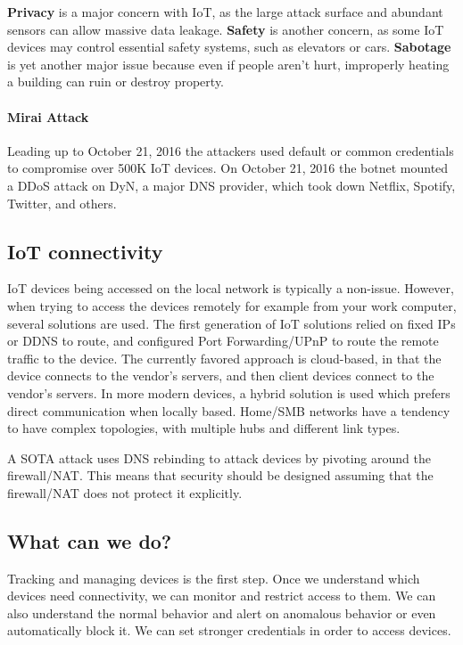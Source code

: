 \documentclass{idc_msc}
\begin{document}
\textbf{Privacy} is a major concern with IoT, as the large attack surface and abundant sensors can allow massive data leakage.
\textbf{Safety} is another concern, as some IoT devices may control essential safety systems, such as elevators or cars.
\textbf{Sabotage} is yet another major issue because even if people aren't hurt, improperly heating a building can ruin or destroy property.

\paragraph{Mirai Attack}

Leading up to October 21, 2016 the attackers used default or common credentials to compromise over 500K IoT devices.
On October 21, 2016 the botnet mounted a DDoS attack on DyN, a major DNS provider, which took down Netflix, Spotify, Twitter, and others.

\subsection{IoT connectivity}

IoT devices being accessed on the local network is typically a non-issue.
However, when trying to access the devices remotely for example from your work computer, several solutions are used.
The first generation of IoT solutions relied on fixed IPs or DDNS to route, and configured Port Forwarding/UPnP to route the remote traffic to the device.
The currently favored approach is cloud-based, in that the device connects to the vendor's servers, and then client devices connect to the vendor's servers.
In more modern devices, a hybrid solution is used which prefers direct communication when locally based.
Home/SMB networks have a tendency to have complex topologies, with multiple hubs and different link types.

A SOTA attack uses DNS rebinding to attack devices by pivoting around the firewall/NAT.
This means that security should be designed assuming that the firewall/NAT does not protect it explicitly.

\subsection{What can we do?}

Tracking and managing devices is the first step.
Once we understand which devices need connectivity, we can monitor and restrict access to them.
We can also understand the normal behavior and alert on anomalous behavior or even automatically block it.
We can set stronger credentials in order to access devices.
\end{document}
